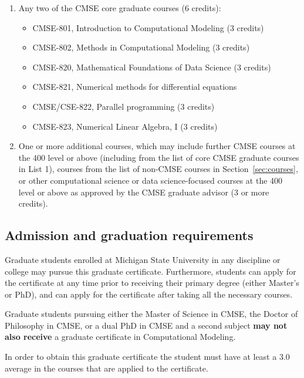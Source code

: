 \begin{enumerate}
\item Any two of the CMSE core graduate courses (6 credits):  

\begin{itemize}
    \item  CMSE-801, Introduction to Computational Modeling (3 credits)
    \item  CMSE-802, Methods in Computational Modeling (3 credits)  
    \item  CMSE-820, Mathematical Foundations of Data Science (3 credits)  
    \item  CMSE-821, Numerical methods for differential equations
    \item  CMSE/CSE-822, Parallel programming (3 credits) 
    \item  CMSE-823, Numerical Linear Algebra, I (3 credits)
\end{itemize}

\item One or more additional courses, which may include further CMSE
  courses at the 400 level or above (including from the list of core
  CMSE graduate courses in List 1), courses from the list of non-CMSE
  courses  in Section~\ref{sec:courses}, or other computational
  science or data science-focused courses at the 400 level or above as
  approved by the CMSE graduate advisor (3 or more credits).

\end{enumerate}

\subsection{Admission and graduation requirements}

Graduate students enrolled at Michigan State University in any
discipline or college may pursue this graduate certificate.
Furthermore, students can apply for the certificate at any time prior
to receiving their primary degree (either Master’s or PhD), and can
apply for the certificate after taking all the necessary courses.

Graduate students pursuing either the Master of Science in CMSE, the
Doctor of Philosophy in CMSE, or a dual PhD in CMSE and a second
subject \textbf{may not also receive} a graduate certificate in
Computational Modeling.

In order to obtain this graduate certificate the student must have at
least a 3.0 average in the courses that are applied to the
certificate.

